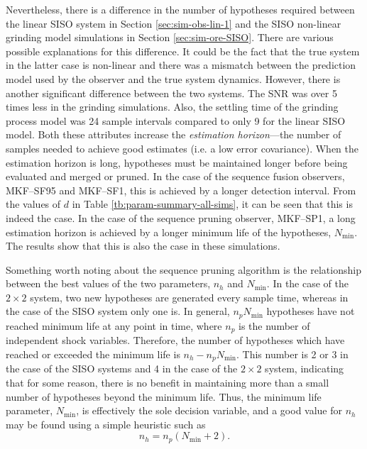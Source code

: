 Nevertheless, there is a difference in the number of hypotheses required between the linear \gls{SISO} system in Section \ref{sec:sim-obs-lin-1} and the \gls{SISO} non-linear grinding model simulations in Section \ref{sec:sim-ore-SISO}. There are various possible explanations for this difference. It could be the fact that the true system in the latter case is non-linear and there was a mismatch between the prediction model used by the observer and the true system dynamics. However, there is another significant difference between the two systems. The \gls{SNR} was over 5 times less in the grinding simulations. Also, the settling time of the grinding process model was 24 sample intervals compared to only 9 for the linear \gls{SISO} model. Both these attributes increase the \textit{estimation horizon}---the number of samples needed to achieve good estimates (i.e. a low error covariance). When the estimation horizon is long, hypotheses must be maintained longer before being evaluated and merged or pruned. In the case of the sequence fusion observers, MKF--SF95 and MKF--SF1, this is achieved by a longer detection interval. From the values of $d$ in Table \ref{tb:param-summary-all-sims}, it can be seen that this is indeed the case. In the case of the sequence pruning observer, MKF--SP1, a long estimation horizon is achieved by a longer minimum life of the hypotheses, $N_\text{min}$. The results show that this is also the case in these simulations.

Something worth noting about the sequence pruning algorithm is the relationship between the best values of the two parameters, $n_h$ and $N_\text{min}$. In the case of the $2 \times 2$ system, two new hypotheses are generated every sample time, whereas in the case of the \gls{SISO} system only one is. In general, $n_pN_\text{min}$ hypotheses have not reached minimum life at any point in time, where $n_p$ is the number of independent shock variables. Therefore, the number of hypotheses which have reached or exceeded the minimum life is $n_h - n_p N_\text{min}$. This number is 2 or 3 in the case of the \gls{SISO} systems and 4 in the case of the $2 \times 2$ system, indicating that for some reason, there is no benefit in maintaining more than a small number of hypotheses beyond the minimum life. Thus, the minimum life parameter, $N_\text{min}$, is effectively the sole decision variable, and a good value for $n_h$ may be found using a simple heuristic such as
\begin{equation} \label{eq:nh-sp}
	n_h = n_p(N_\text{min}+2).
\end{equation}

